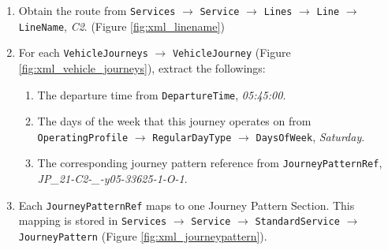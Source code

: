 \begin{enumerate}
  \item Obtain the route from \texttt{Services} $\rightarrow$ \texttt{Service} $\rightarrow$ \texttt{Lines} $\rightarrow$ \texttt{Line} $\rightarrow$ \texttt{LineName}, \textit{C2}. (Figure \ref{fig:xml_linename})
  \item For each \texttt{VehicleJourneys} $\rightarrow$ \texttt{VehicleJourney} (Figure \ref{fig:xml_vehicle_journeys}), extract the followings:
  \begin{enumerate}
    \item The departure time from \texttt{DepartureTime}, \textit{05:45:00}.
    \item The days of the week that this journey operates on from \texttt{OperatingProfile} $\rightarrow$ \texttt{RegularDayType} $\rightarrow$ \texttt{DaysOfWeek}, \textit{Saturday}.
    \item The corresponding journey pattern reference from \texttt{JourneyPatternRef}, \textit{JP\_21-C2-\_-y05-33625-1-O-1}.
  \end{enumerate}
  \item Each \texttt{JourneyPatternRef} maps to one Journey Pattern Section. This mapping is stored in \texttt{Services} $\rightarrow$ \texttt{Service} $\rightarrow$ \texttt{StandardService} $\rightarrow$ \texttt{JourneyPattern} (Figure \ref{fig:xml_journeypattern}).


\end{enumerate}
